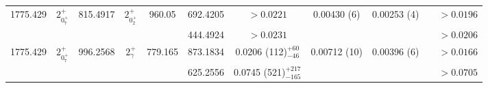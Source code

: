 \begin{landscape}
\begin{longtable}{>{\footnotesize}c|>{\footnotesize}c|>{\footnotesize}c|>{\footnotesize}c|>{\footnotesize}c|>{\footnotesize}c|>{\footnotesize}c|>{\footnotesize}c|>{\footnotesize}c|>{\footnotesize}c|>{\footnotesize}c}
        1775.429 & $2^+_{0^+_7}$ & 815.4917 & $2^+_{0^+_2}$ & 960.05 &  692.4205 & $>0.0221$ & 0.00430 (6) & 0.00253 (4) & & $>0.0196$ \\
        &  & & &  & 444.4924 & $>0.0231$ & & &  & $>0.0206$\\ \hline
        1775.429 & $2^+_{0^+_7}$ & 996.2568 & $2^+_{\gamma}$ & 779.165 & 873.1834 & 0.0206 (112)$^{+60}_{-46}$ & 0.00712 (10) & 0.00396 (6) & & $>0.0166$\\
        &  & &  &  & 625.2556 & 0.0745 (521)$^{+217}_{-165}$	& & & & $>0.0705$\\
        \bottomrule
    \end{longtable}
\end{landscape}